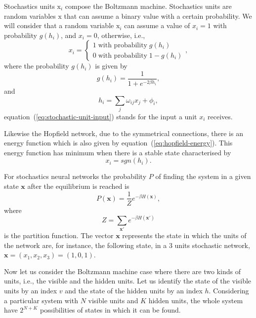 Stochastics units $\mathrm{x}_{i}$ compose the Boltzmann machine. 
Stochastics units are random variables $\mathrm{x}$ that can assume a binary value with a certain probability.
We will consider that a random variable $\mathrm{x}_{i}$ can assume a value of $x_{i} = 1$ with probability $g(h_{i})$, and $x_{i} = 0$, otherwise, i.e.,
\begin{equation}
  \label{eq:stochastic-unit-values}
  x_{i} =
    \begin{cases}
      1 \; \text{with probability} \; g(h_{i}) \\
      0 \; \text{with probability} \; 1 - g(h_{i})
    \end{cases},
\end{equation}
where the probability $g(h_{i})$ is given by
\begin{equation}
  \label{eq:stochastic-unit-prob}
  g(h_{i}) = \frac{1}{1 + e^{-2 \beta h_{i}}},
\end{equation}
and
\begin{equation}
  \label{eq:stochastic-unit-input}
  h_{i} = \sum_{j}\omega_{ij}x_{j} + \phi_{i},
\end{equation}
equation~(\ref{eq:stochastic-unit-input}) stands for the input a unit $x_{i}$ receives.

Likewise the Hopfield network, due to the symmetrical connections, there is an energy function which is also given by equation~(\ref{eq:hopfield-energy}). This energy function has minimum when there is a stable state characterised by
\begin{equation}
  \label{eq:stochastic-stable-state}
  x_{i} = sgn(h_{i}).
\end{equation}

For stochastics neural networks the probability $P$ of finding the system in a given state $\mathbf{x}$ after the equilibrium is reached is
\begin{equation}
  \label{eq:stochastic-prob}
  P(\mathbf{x}) = \frac{1}{Z} e^{-\beta H(\mathbf{x})},
\end{equation}
where
\begin{equation}
  \label{eq:stochastic-z}
  Z = \sum_{\mathbf{x}'} e^{-\beta H(\mathbf{x}')}
\end{equation}
is the partition function. The vector $\mathrm{\mathbf{x}}$ represents the state in which the units of the network are, for instance, the following state, in a 3 units stochastic network, $\mathrm{\mathbf{x}} = (x_{1}, x_{2}, x_{3}) = (1, 0, 1)$.

Now let us consider the Boltzmann machine case where there are two kinds of units, i.e., the visible and the hidden units. 
Let us identify the state of the visible units by an index $v$ and the state of the hidden units by an index $h$. 
Considering a particular system with $N$ visible units and $K$ hidden units, the whole system have $2^{N + K}$ possibilities of states in which it can be found.

